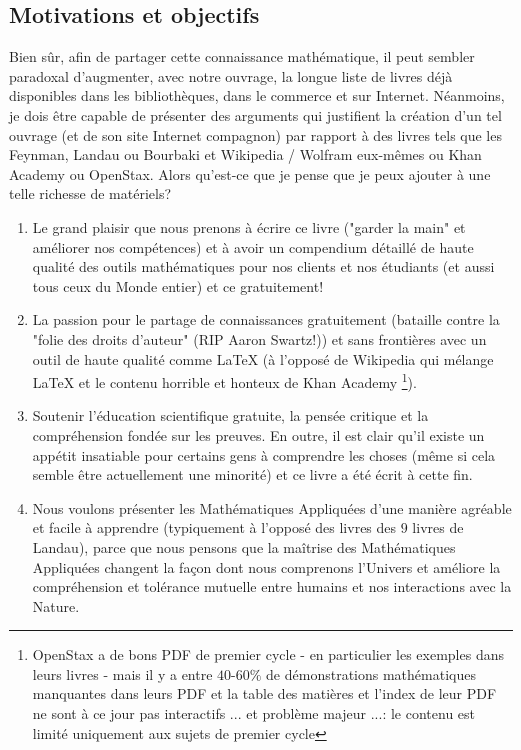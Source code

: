 	\subsection{Motivations et objectifs}
	Bien sûr, afin de partager cette connaissance math\'ematique, il peut sembler paradoxal d'augmenter, avec notre ouvrage, la longue liste de livres d\'ejà disponibles dans les bibliothèques, dans le commerce et sur Internet. N\'eanmoins, je dois être capable de pr\'esenter des arguments qui justifient la cr\'eation d'un tel ouvrage (et de son site Internet compagnon) par rapport à des livres tels que les Feynman, Landau ou Bourbaki et Wikipedia / Wolfram eux-mêmes ou Khan Academy ou OpenStax. Alors qu'est-ce que je pense que je peux ajouter à une telle richesse de mat\'eriels?
	\begin{enumerate}
		\item Le grand plaisir que nous prenons à \'ecrire ce livre ("garder la main" et am\'eliorer nos comp\'etences) et à avoir un compendium d\'etaill\'e de haute qualit\'e des outils math\'ematiques pour nos clients et nos \'etudiants (et aussi tous ceux du Monde entier) et ce gratuitement!

		\item La passion pour le partage de connaissances gratuitement (bataille contre la "folie des droits d'auteur" (RIP Aaron Swartz!)) et sans frontières avec un outil de haute qualit\'e comme \LaTeX{} (à l'oppos\'e de Wikipedia qui m\'elange \LaTeX{} et le contenu horrible et honteux de Khan Academy \footnote{OpenStax a de bons PDF de premier cycle - en particulier les exemples dans leurs livres - mais il y a entre $40$-$60\%$ de d\'emonstrations math\'ematiques manquantes dans leurs PDF et la table des matières et l'index de leur PDF ne sont à ce jour pas interactifs ... et problème majeur ...: le contenu est limit\'e uniquement aux sujets de premier cycle}).
		
		\item Soutenir l'\'education scientifique gratuite, la pens\'ee critique et la compr\'ehension fond\'ee sur les preuves. En outre, il est clair qu'il existe un app\'etit insatiable pour certains gens à comprendre les choses (même si cela semble être actuellement une minorit\'e) et ce livre a \'et\'e \'ecrit à cette fin.
		
		\item Nous voulons pr\'esenter les Math\'ematiques Appliqu\'ees d'une manière agr\'eable et facile à apprendre (typiquement à l'oppos\'e des livres des $9$ livres de Landau), parce que nous pensons que la maîtrise des Math\'ematiques Appliqu\'ees changent la façon dont nous comprenons l'Univers et am\'eliore la compr\'ehension et tol\'erance mutuelle entre humains et nos interactions avec la Nature.
		

\end{enumerate}

